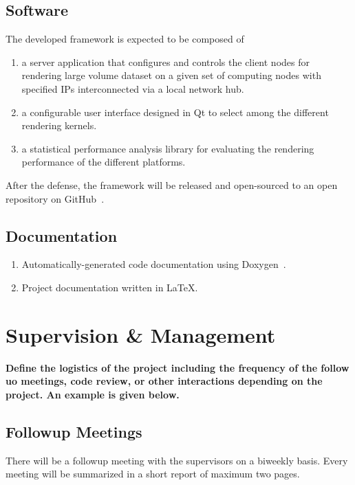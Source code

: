 \documentclass[12pt]{article} 				%
\begin{document}
\subsection{Software}

The developed framework is expected to be composed of 
\begin{enumerate}
\item a server application that configures and controls the client nodes for rendering large volume dataset on a given set of computing nodes with specified \acs{IP}s interconnected via a local network hub.
\item a configurable user interface designed in Qt to select among the different rendering kernels.
\item a statistical performance analysis library for evaluating the rendering performance of the different platforms.
\end{enumerate}

After the defense, the framework will be released and open-sourced to an open repository on GitHub~\cite{github}.

\subsection{Documentation}
\begin{enumerate}
\item Automatically-generated code documentation using Doxygen~\cite{doxygen}.
\item Project documentation written in \LaTeX.
\end{enumerate}

\section{Supervision \& Management} \label{section:supervision-and-management}
\textbf{Define the logistics of the project including the frequency of the follow uo meetings, code review, or other interactions depending on the project. An example is given below.}

\vspace*{1cm}

\subsection{Followup Meetings}
There will be a followup meeting with the supervisors on a biweekly basis. Every meeting will be summarized in a short report of maximum two pages. 
\end{document}
